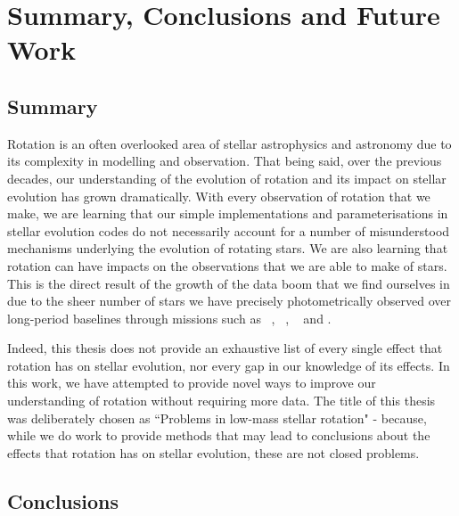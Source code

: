 \newcommand\wfirst{\project{WFIRST}}
\newcommand\plato{\project{PLATO}}
\newcommand\haydn{\project{HAYDN}}


 
\chapter {Summary, Conclusions and Future Work}
\label{chap:conc}

\section{Summary}

Rotation is an often overlooked area of stellar astrophysics and astronomy due to its complexity in modelling and observation.
That being said, over the previous decades, our understanding of the evolution of rotation and its impact on stellar evolution has grown dramatically.
With every observation of rotation that we make, we are learning that our simple implementations and parameterisations in stellar evolution codes do not necessarily account for a number of misunderstood mechanisms underlying the evolution of rotating stars.
We are also learning that rotation can have impacts on the observations that we are able to make of stars.
This is the direct result of the growth of the data boom that we find ourselves in due to the sheer number of stars we have precisely photometrically observed over long-period baselines through missions such as \kepler\ \citep{borucki_kepler_2010}, \ktoo\ \citep{howell_k2_2014}, \tess\ \citep{ricker_transiting_2014} and \gaia{} \citep{distefano_gaia_2022} .

Indeed, this thesis does not provide an exhaustive list of every single effect that rotation has on stellar evolution, nor every gap in our knowledge of its effects.
In this work, we have attempted to provide novel ways to improve our understanding of rotation without requiring more data.
The title of this thesis was deliberately chosen as ``Problems in low-mass stellar rotation" - because, while we do work to provide methods that may lead to conclusions about the effects that rotation has on stellar evolution, these are not closed problems.

\section{Conclusions}

